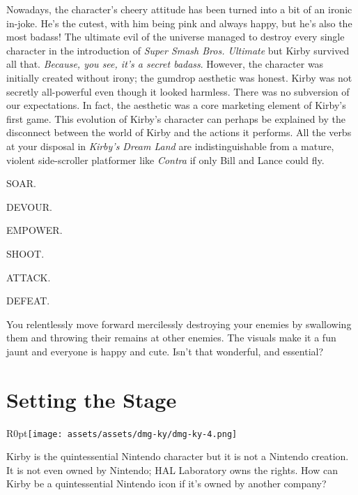 \documentclass{book}
\begin{document}
\FloatBarrier\vspace{\baselineskip}\begin{figure}[H]\end{figure}
Nowadays, the character’s cheery attitude has been turned into a bit of an ironic in-joke. He’s the cutest, with him being pink and always happy, but he’s also the most badass! The ultimate evil of the universe managed to destroy every single character in the introduction of \emph{Super Smash Bros. Ultimate} but Kirby survived all that. \emph{Because, you see, it’s a secret badass}. However, the character was initially created without irony; the gumdrop aesthetic was honest. Kirby was not secretly all-powerful even though it looked harmless. There was no subversion of our expectations. In fact, the aesthetic was a core marketing element of Kirby’s first game. This evolution of Kirby’s character can perhaps be explained by the disconnect between the world of Kirby and the actions it performs. All the verbs at your disposal in \emph{Kirby’s Dream Land} are indistinguishable from a mature, violent side-scroller platformer like \emph{Contra} if only Bill and Lance could fly.\par
SOAR.\par
DEVOUR.\par
EMPOWER.\par
SHOOT.\par
ATTACK.\par
DEFEAT.\par
You relentlessly move forward mercilessly destroying your enemies by swallowing them and throwing their remains at other enemies. The visuals make it a fun jaunt and everyone is happy and cute. Isn’t that wonderful, and essential?\par
\FloatBarrier\section*{Setting the Stage}
\begin{wrapfigure}{R}{0pt}{\texttt{[image: assets/assets/dmg-ky/dmg-ky-4.png]}}\end{wrapfigure}
Kirby is the quintessential Nintendo character but it is not a Nintendo creation. It is not even owned by Nintendo; HAL Laboratory owns the rights. How can Kirby be a quintessential Nintendo icon if it’s owned by another company?\par
\end{document}
